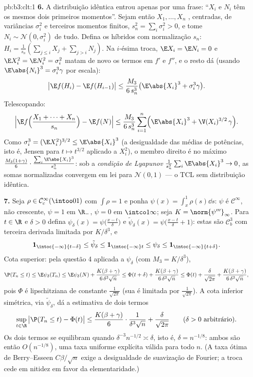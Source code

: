 \begin{solution}{pb:b3:clt:1}
\textbf{6.} A distribuição idêntica entrou apenas por uma
frase: ``$X_i$ e $N_i$ têm os mesmos dois primeiros
momentos''. Sejam então $X_1, \dots, X_n$ ,
centradas, de variâncias $\sigma_i^2$ e terceiros
momentos finitos, $s_n^2 = \sum_i\sigma_i^2 > 0$, e tome $N_i \sim
\mathcal N(0, \sigma_i^2)$  de tudo.
Defina os híbridos com normalização $s_n$: $H_i =
\frac1{s_n}(\sum_{j\leq i}X_j + \sum_{j>i}N_j)$. Na
$i$-ésima troca, $\E X_i = \E N_i = 0$ e $\E X_i^2 = \E N_i^2
= \sigma_i^2$ matam de novo os termos em $f'$ e $f''$, e o
resto dá (usando $\E\abs{N_i}^3 = \sigma_i^3\gamma$ por
escala):
\[
\bigl|\E f(H_i) - \E f(H_{i-1})\bigr| \leq
\frac{M_3}{6\,s_n^3}\bigl(\E\abs{X_i}^3 +
\sigma_i^3\gamma\bigr) .
\]
Telescopando:
\[
\Bigl|\E f\Bigl(\frac{X_1 + \dots + X_n}{s_n}\Bigr) -
\E f(N)\Bigr| \leq \frac{M_3}{6\,s_n^3}\sum_{i=1}^n
\Bigl(\E\abs{X_i}^3 + \V(X_i)^{3/2}\,\gamma\Bigr) .
\]
Como $\sigma_i^3 = (\E X_i^2)^{3/2} \leq \E\abs{X_i}^3$
(a desigualdade das médias de potências, isto é, Jensen para $t \mapsto
t^{3/2}$ aplicado a $X_i^2$), o membro direito é no máximo
$\frac{M_3(1 + \gamma)}{6}\cdot
\frac{\sum_i\E\abs{X_i}^3}{s_n^3}$: sob a \emph{condição de Lyapunov}
$\frac1{s_n^3}\sum_i\E\abs{X_i}^3 \to 0$, as
somas normalizadas convergem em lei para $\mathcal N(0,1)$ ---
o TCL sem distribuição idêntica.

\textbf{7.} Seja $\rho \in \mathcal C^\infty_c(\intoo01)$
com $\int\rho = 1$ e ponha $\psi(x) = \int_x^1\rho(s)\dd
s$: $\psi$ é $\mathcal C^\infty$, não crescente, $\psi = 1$
em $\R_-$, $\psi = 0$ em $\intco1\infty$; seja $K =
\norm{\psi'''}_\infty$. Para $t \in \R$ e $\delta > 0$
defina $\psi_\delta(x) = \psi\bigl(\frac{x - t}\delta\bigr)$
e $\tilde\psi_\delta(x) = \psi\bigl(\frac{x - t}\delta +
1\bigr)$: estas são $\mathcal C^3_b$ com terceira derivada
limitada por $K/\delta^3$, e
\[
\mathbf 1_{\intoc{-\infty}{t-\delta}} \leq
\tilde\psi_\delta \leq \mathbf 1_{\intoc{-\infty}t} \leq
\psi_\delta \leq \mathbf 1_{\intoc{-\infty}{t+\delta}} .
\]
Cota superior: pela questão 4 aplicada a $\psi_\delta$ (com
$M_3 = K/\delta^3$),
\[
\P(T_n \leq t) \leq \E\psi_\delta(T_n) \leq
\E\psi_\delta(N) + \frac{K(\beta +
\gamma)}{6\,\delta^3\sqrt n}
\leq \Phi(t + \delta) + \frac{K(\beta +
\gamma)}{6\,\delta^3\sqrt n}
\leq \Phi(t) + \frac{\delta}{\sqrt{2\pi}} +
\frac{K(\beta + \gamma)}{6\,\delta^3\sqrt n},
\]
pois $\Phi$ é lipschitziana de constante
$\frac1{\sqrt{2\pi}}$ (sua  é limitada por
$\frac1{\sqrt{2\pi}}$). A cota inferior simétrica, via
$\tilde\psi_\delta$, dá a estimativa de dois termos
\[
\sup_{t\in\R}\,\bigl|\P(T_n \leq t) - \Phi(t)\bigr| \leq
\frac{K(\beta + \gamma)}{6}\cdot\frac{1}{\delta^3\sqrt n} +
\frac{\delta}{\sqrt{2\pi}}
\qquad(\delta > 0\ \text{arbitrário}).
\]
Os dois termos se equilibram quando $\delta^{-3}n^{-1/2} \asymp
\delta$, isto é, $\delta = n^{-1/8}$: ambos são então
$O(n^{-1/8})$, uma taxa uniforme explícita válida para todo
$n$. (A taxa ótima de Berry--Esseen $C\beta/\sqrt n$
exige a desigualdade de suavização de Fourier; a troca cede
em nitidez em favor da  elementaridade.)


\end{solution}
